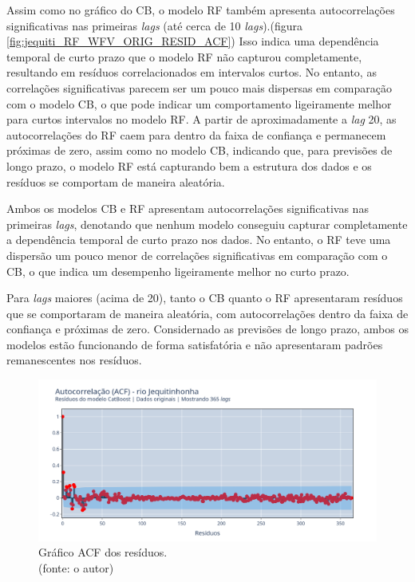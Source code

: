 Assim como no gráfico do CB, o modelo RF também apresenta autocorrelações significativas nas primeiras \textit{lags} (até cerca de 10 \textit{lags}).(figura \ref{fig:jequiti_RF_WFV_ORIG_RESID_ACF}) Isso indica uma dependência temporal de curto prazo que o modelo RF não capturou completamente, resultando em resíduos correlacionados em intervalos curtos. No entanto, as correlações significativas parecem ser um pouco mais dispersas em comparação com o modelo CB, o que pode indicar um comportamento ligeiramente melhor para curtos intervalos no modelo RF. A partir de aproximadamente a \textit{lag} 20, as autocorrelações do RF caem para dentro da faixa de confiança e permanecem próximas de zero, assim como no modelo CB, indicando que, para previsões de longo prazo, o modelo RF está capturando bem a estrutura dos dados e os resíduos se comportam de maneira aleatória.

Ambos os modelos CB e RF apresentam autocorrelações significativas nas primeiras \textit{lags}, denotando que nenhum modelo conseguiu capturar completamente a dependência temporal de curto prazo nos dados. No entanto, o RF teve uma dispersão um pouco menor de correlações significativas em comparação com o CB, o que indica um desempenho ligeiramente melhor no curto prazo.

Para \textit{lags} maiores (acima de 20), tanto o CB quanto o RF apresentaram resíduos que se comportaram de maneira aleatória, com autocorrelações dentro da faixa de confiança e próximas de zero. Considernado as previsões de longo prazo, ambos os modelos estão funcionando de forma satisfatória e não apresentaram padrões remanescentes nos resíduos.

\begin{figure}[!h]
	\centering
	\includegraphics[scale=0.33]{Figuras/jequiti/wfv/CB/CB_WFV_ORIG_RESID_ACF.png}
	\caption{Gráfico ACF dos resíduos.\\(fonte: o autor)}
	\label{fig:jequiti_CB_WFV_ORIG_RESID_ACF}
\end{figure}

